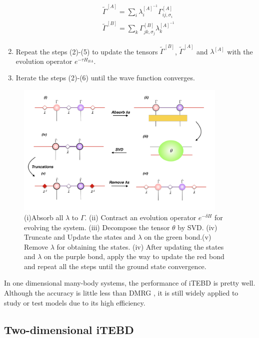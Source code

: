 \begin{enumerate}
			\begin{align}
				&\widetilde{\Gamma}^{[A]} = \sum_{i}{ \lambda_{i}^{[A]^{-1}} \Gamma^{[A]}_{ij,\sigma_i}} \\
				&\widetilde{\Gamma}^{[B]} = \sum_{k}{\Gamma^{[B]}_{jk,\sigma_j} \lambda_{k}^{[A]^{-1}}}
			\end{align}
		\item Repeat the steps (2)-(5) to update the tensors $\widetilde{\Gamma}^{[B]}$, $\widetilde{\Gamma}^{[A]}$ and $\lambda^{[A]}$ with the evolution operator $e^{-\tau H_{BA}}$.
		\item Iterate the steps (2)-(6) until the wave function converges.
\end{enumerate}

\begin{figure}[ht][b]
	\centering
	\includegraphics[width=0.90\textwidth]{figures/fig313.png}
	\caption[The tensor network diagrams for the 1-D iTEBD]{ (i)Absorb all $\lambda$ to $\Gamma$. (ii) Contract an evolution operator $e^{-\delta H}$ for evolving the system. (iii) Decompose the tensor $\theta$ by SVD. (iv) Truncate and Update the states and $\lambda$ on the green bond.(v) Remove $
		\lambda$ for obtaining the states. (iv) After updating the states and $\lambda$ on the purple bond, apply the way to update the red bond and repeat all the steps until the ground state convergence.}
	\label{fig314}
\end{figure}

In one dimensional many-body systems, the performance of iTEBD is pretty well. Although the accuracy is little less than DMRG \cite{}, it is still widely applied to study or test models due to its high efficiency.

\subsection{Two-dimensional iTEBD}
\label{2ditebd}

